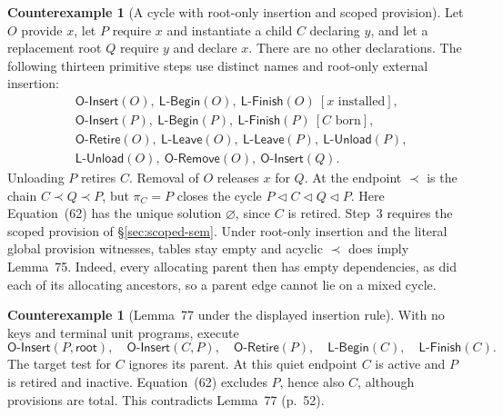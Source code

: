 \documentclass[11pt,a4paper]{article}
\theoremstyle{definition}
\newtheorem{counterexample}[definition]{Counterexample}
\theoremstyle{plain}
\newcommand{\Root}{\mathsf{root}}
\newcommand{\OInsert}{\mathsf{O\text{-}Insert}}
\newcommand{\ORetire}{\mathsf{O\text{-}Retire}}
\newcommand{\ORemove}{\mathsf{O\text{-}Remove}}
\newcommand{\LBegin}{\mathsf{L\text{-}Begin}}
\newcommand{\LFinish}{\mathsf{L\text{-}Finish}}
\newcommand{\LLeave}{\mathsf{L\text{-}Leave}}
\newcommand{\LUnload}{\mathsf{L\text{-}Unload}}
\begin{document}
\begin{counterexample}[A cycle with root-only insertion and scoped provision]
Let $O$ provide $x$, let $P$ require $x$ and instantiate a child $C$ declaring $y$, and let a replacement root $Q$ require $y$ and declare $x$. There are no other declarations. The following thirteen primitive steps use distinct names and root-only external insertion:
\[
\begin{aligned}
 &\OInsert(O),\ \LBegin(O),\ \LFinish(O)\ [x\text{ installed}],\\
 &\OInsert(P),\ \LBegin(P),\ \LFinish(P)\ [C\text{ born}],\\
 &\ORetire(O),\ \LLeave(O),\ \LLeave(P),\ \LUnload(P),\\
 &\LUnload(O),\ \ORemove(O),\ \OInsert(Q).
\end{aligned}
\]
Unloading $P$ retires $C$. Removal of $O$ releases $x$ for $Q$. At the endpoint $\prec$ is the chain $C\prec Q\prec P$, but $\pi_C=P$ closes the cycle $P\triangleleft C\triangleleft Q\triangleleft P$. Here Equation~(62) has the unique solution $\varnothing$, since $C$ is retired.
Step~3 requires the scoped provision of \S\ref{sec:scoped-sem}. Under root-only insertion and the literal global provision witnesses, tables stay empty and acyclic $\prec$ does imply Lemma~75. Indeed, every allocating parent then has empty dependencies, as did each of its allocating ancestors, so a parent edge cannot lie on a mixed cycle.
\end{counterexample}

\begin{counterexample}[Lemma~77 under the displayed insertion rule]
With no keys and terminal unit programs, execute
\[
  \OInsert(P,\Root),\quad \OInsert(C,P),\quad
  \ORetire(P),\quad \LBegin(C),\quad \LFinish(C).
\]
The target test for $C$ ignores its parent. At this quiet endpoint $C$ is active and $P$ is retired and inactive. Equation~(62) excludes $P$, hence also $C$, although provisions are total. This contradicts Lemma~77 (p.~52).
\end{counterexample}
\end{document}
